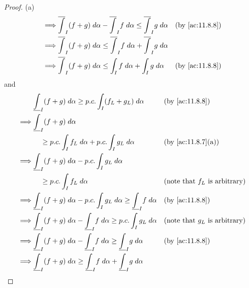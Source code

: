 \begin{proof}{(a)}
\begin{align*}
    \implies & \overline{\int}_I (f + g) \; d \alpha - \overline{\int}_I f \; d \alpha \leq \overline{\int}_I g \; d \alpha &   & \text{(by \cref{ac:11.8.8})}            \\
    \implies & \overline{\int}_I (f + g) \; d \alpha \leq \overline{\int}_I f \; d \alpha + \overline{\int}_I g \; d \alpha &                                             \\
    \implies & \overline{\int}_I (f + g) \; d \alpha \leq \int_I f \; d \alpha + \int_I g \; d \alpha                       &   & \text{(by \cref{ac:11.8.8})}
  \end{align*}
  and
  \begin{align*}
             & \underline{\int}_I (f + g) \; d \alpha \geq p.c. \int_I (f_L + g_L) \; d \alpha                                 &   & \text{(by \cref{ac:11.8.8})}            \\
    \implies & \underline{\int}_I (f + g) \; d \alpha                                                                                                                        \\
             & \quad \geq p.c. \int_I f_L \; d \alpha + p.c. \int_I g_L \; d \alpha                                            &   & \text{(by \cref{ac:11.8.7}(a))}         \\
    \implies & \underline{\int}_I (f + g) \; d \alpha - p.c. \int_I g_L \; d \alpha                                                                                          \\
             & \quad \geq p.c. \int_I f_L \; d \alpha                                                                          &   & \text{(note that \(f_L\) is arbitrary)} \\
    \implies & \underline{\int}_I (f + g) \; d \alpha - p.c. \int_I g_L \; d \alpha \geq \underline{\int}_I f \; d \alpha      &   & \text{(by \cref{ac:11.8.8})}            \\
    \implies & \underline{\int}_I (f + g) \; d \alpha - \underline{\int}_I f \; d \alpha \geq p.c. \int_I g_L \; d \alpha      &   & \text{(note that \(g_L\) is arbitrary)} \\
    \implies & \underline{\int}_I (f + g) \; d \alpha - \underline{\int}_I f \; d \alpha \geq \underline{\int}_I g \; d \alpha &   & \text{(by \cref{ac:11.8.8})}            \\
    \implies & \underline{\int}_I (f + g) \; d \alpha \geq \underline{\int}_I f \; d \alpha + \underline{\int}_I g \; d \alpha &                                             \\

\end{align*}
\end{proof}

